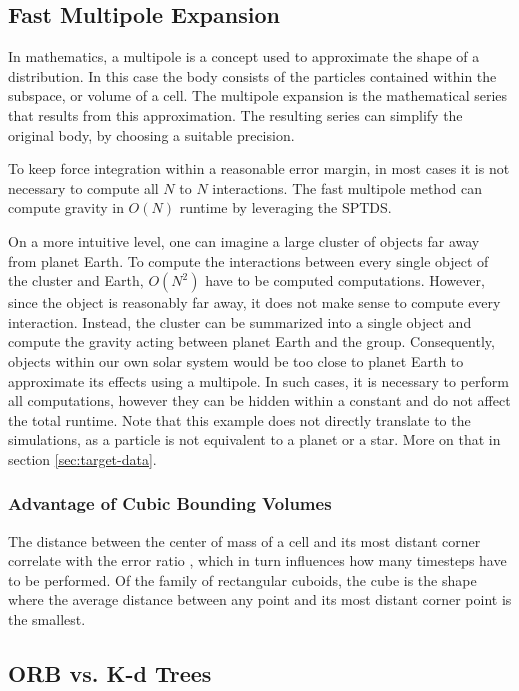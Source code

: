 \documentclass[]{article}
\begin{document}
\subsection{Fast Multipole Expansion} \label{sec:multipole}

In mathematics, a multipole is a concept used to approximate the shape of a distribution. In this case the body consists of the particles contained within the subspace, or volume of a cell. The multipole expansion is the mathematical series that results from this approximation. The resulting series can simplify the original body, by choosing a suitable precision.

To keep force integration within a reasonable error margin, in most cases it is not necessary to compute all $N$ to $N$ interactions. The fast multipole method can compute gravity in $O(N)$ runtime by leveraging the SPTDS. \cite{Stadel2001}

On a more intuitive level, one can imagine a large cluster of objects far away from planet Earth. To compute the interactions between every single object of the cluster and Earth, $O(N^2)$ have to be computed computations. However, since the object is reasonably far away, it does not make sense to compute every interaction. Instead, the cluster can be summarized into a single object and compute the gravity acting between planet Earth and the group. Consequently, objects within our own solar system would be too close to planet Earth to approximate its effects using a multipole. In such cases, it is necessary to perform all computations, however they can be hidden within a constant and do not affect the total runtime. 
Note that this example does not directly translate to the simulations, as a particle is not equivalent to a planet or a star. More on that in section \ref{sec:target-data}.


\subsubsection{Advantage of Cubic Bounding Volumes}\label{sec:cubic}

The distance between the center of mass of a cell and its most distant corner correlate with the error ratio \cite{Stadel2001}, which in turn influences how many timesteps have to be performed. Of the family of rectangular cuboids, the cube is the shape where the average distance between any point and its most distant corner point is the smallest. 

\subsection{ORB vs. K-d Trees}
\end{document}
